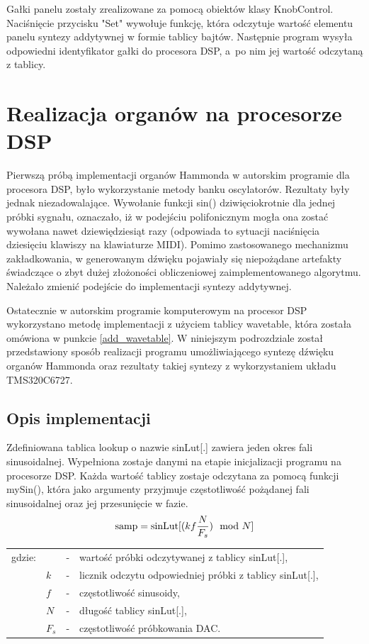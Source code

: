 Gałki panelu zostały zrealizowane za pomocą obiektów klasy KnobControl. Naciśnięcie przycisku "Set" wywołuje funkcję, która odczytuje wartość elementu panelu syntezy addytywnej w formie tablicy bajtów. Następnie program wysyła odpowiedni identyfikator gałki do procesora DSP, a~po nim jej wartość odczytaną z tablicy.

\section{Realizacja organów na procesorze DSP}
Pierwszą próbą implementacji organów Hammonda w autorskim programie dla procesora DSP, było wykorzystanie metody banku oscylatorów. Rezultaty były jednak niezadowalające. Wywołanie funkcji sin() dziwięciokrotnie dla jednej próbki sygnału, oznaczało, iż w podejściu polifonicznym mogła ona zostać wywołana nawet dziewiędziesiąt razy (odpowiada to sytuacji naciśnięcia dziesięciu klawiszy na klawiaturze MIDI).
Pomimo zastosowanego mechanizmu zakładkowania, w generowanym dźwięku pojawiały się niepożądane artefakty świadczące o zbyt dużej złożoności obliczeniowej zaimplementowanego algorytmu. Należało zmienić podejście do implementacji syntezy addytywnej.

Ostatecznie w autorskim programie komputerowym na procesor DSP wykorzystano metodę implementacji z użyciem tablicy wavetable, która została omówiona w punkcie \ref{add_wavetable}. W niniejszym podrozdziale został przedstawiony sposób realizacji programu umożliwiającego syntezę dźwięku organów Hammonda oraz rezultaty takiej syntezy z wykorzystaniem układu TMS320C6727.

\subsection{Opis implementacji}
Zdefiniowana tablica lookup o nazwie sinLut[.] zawiera jeden okres fali sinusoidalnej. Wypełniona zostaje danymi na etapie inicjalizacji programu na procesorze DSP. Każda wartość tablicy zostaje odczytana za pomocą funkcji mySin(), która jako argumenty przyjmuje częstotliwość pożądanej fali sinusoidalnej oraz jej przesunięcie w fazie.
\begin{equation} \label{equ:addit_sinLut}
\text{samp} = \text{sinLut}[(kf\frac{N}{F_s})\mod{N}] \\  
\end{equation}
\begin{tabular}{ l l l l}
	gdzie: & \text{samp} &  - & wartość próbki odczytywanej z tablicy sinLut[.], \\
	& $k$ &  - & licznik odczytu odpowiedniej próbki z tablicy sinLut[.], \\
	& $f$ & - & częstotliwość sinusoidy, \\
	& $N$ & - & długość tablicy sinLut[.], \\
	& $F_s$ & - & częstotliwość próbkowania DAC. \\
\end{tabular} \\

